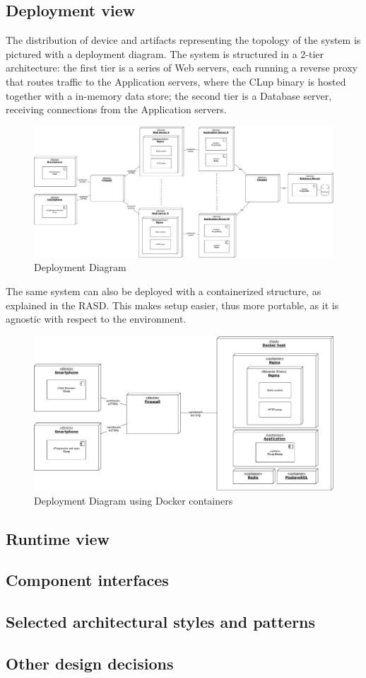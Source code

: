 \subsection{Deployment view}
The distribution of device and artifacts representing the topology of the system is pictured with a deployment diagram.
The system is structured in a 2-tier architecture: the first tier is a series of Web servers, each running a reverse proxy that routes traffic to the Application servers, where the CLup binary is hosted together with a in-memory data store; the second tier is a Database server, receiving connections from the Application servers.
\begin{figure}[H]
    \centering
    \includegraphics[width=1\textwidth]{Images/deployment-1.pdf}
    \caption{Deployment Diagram}
\end{figure}
\newpage
The same system can also be deployed with a containerized structure, as explained in the RASD. This makes setup easier, thus more portable, as it is agnostic with respect to the environment.
\begin{figure}[H]
    \centering
    \includegraphics[width=1\textwidth]{Images/deployment-2.pdf}
    \caption{Deployment Diagram using Docker containers}
\end{figure}

\subsection{Runtime view}

\subsection{Component interfaces}

\subsection{Selected architectural styles and patterns}

\subsection{Other design decisions}
